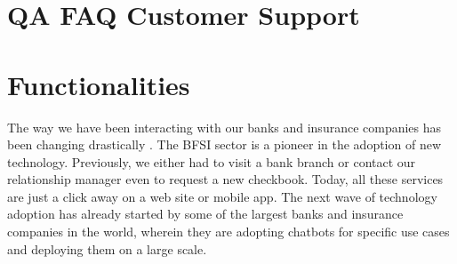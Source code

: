 


\section{QA FAQ Customer Support}

\section{Functionalities}



















The way we have been interacting with our banks and insurance companies has been changing drastically \cite{khan2018}. The BFSI sector is a pioneer in the adoption of new technology. Previously, we either had to visit a bank branch or contact our relationship manager even to request a new checkbook. Today, all these services are just a click away on a web site or mobile app. The next wave of technology adoption has already started by some of the largest banks and insurance companies in the world, wherein they are adopting chatbots for specific use cases and deploying them on a large scale. 





